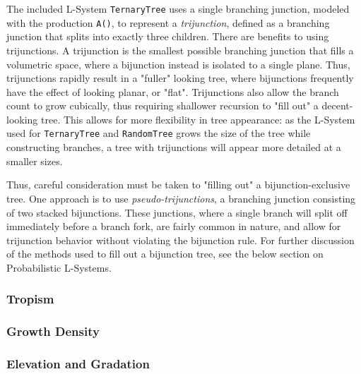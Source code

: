 \documentclass{article}
\newcommand{\tab}{\hspace*{2em}}
\begin{document}
    \tab The included L-System \verb|TernaryTree| uses a single branching junction, modeled with
the production \verb|A()|, to represent a \emph{trijunction}, defined as a branching junction that
splits into exactly three children\cite{abp96}. There are benefits to using trijunctions. A
trijunction is the smallest possible branching junction that fills a volumetric space, where a
bijunction instead is isolated to a single plane. Thus, trijunctions rapidly result in a "fuller"
looking tree, where bijunctions frequently have the effect of looking planar, or "flat".
Trijunctions also allow the branch count to grow cubically, thus requiring shallower recursion
to "fill out" a decent-looking tree. This allows for more flexibility in tree appearance: as the
L-System used for \verb|TernaryTree| and \verb|RandomTree| grows the size of the tree while
constructing branches, a tree with trijunctions will appear more detailed at a smaller sizes.

    \tab Thus, careful consideration must be taken to "filling out" a bijunction-exclusive tree.
One approach is to use \emph{pseudo-trijunctions}, a branching junction consisting of two stacked
bijunctions. These junctions, where a single branch will split off immediately before a branch
fork, are fairly common in nature, and allow for trijunction behavior without violating the
bijunction rule. For further discussion of the methods used to fill out a bijunction tree, see the
below section on Probabilistic L-Systems.

            \subsubsection{Tropism}
            \subsubsection{Growth Density}
            \subsubsection{Elevation and Gradation}
\end{document}
